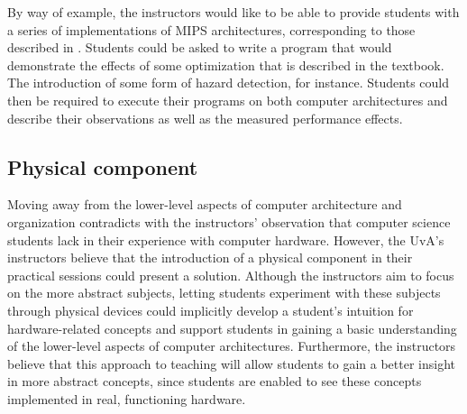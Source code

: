 \documentclass[openright]{template/uva-bachelor-thesis}
\begin{document}
By way of example, the instructors would like to be able to provide students with a series of implementations of MIPS architectures, corresponding to those described in \cite[Ch. 4]{hennessy2013computer}. Students could be asked to write a program that would demonstrate the effects of some optimization that is described in the textbook. The introduction of some form of hazard detection, for instance. Students could then be required to execute their programs on both computer architectures and describe their observations as well as the measured performance effects. 



\subsection{Physical component}

Moving away from the lower-level aspects of computer architecture and organization contradicts with the instructors' observation that computer science students lack in their experience with computer hardware. However, the UvA's instructors believe that the introduction of a physical component in their practical sessions could present a solution. Although the instructors aim to focus on the more abstract subjects, letting students experiment with these subjects through physical devices could implicitly develop a student's intuition for hardware-related concepts and support students in gaining a basic understanding of the lower-level aspects of computer architectures. Furthermore, the instructors believe that this approach to teaching will allow students to gain a better insight in more abstract concepts, since students are enabled to see these concepts  implemented in real, functioning hardware.


\end{document}
